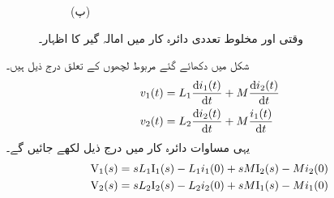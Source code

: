 \begin{figure}
\begin{subfigure}{0.6\textwidth}
\caption*{(پ)}
\end{subfigure}%
\caption{وقتی اور مخلوط تعددی دائرہ کار میں امالہ گیر کا اظہار۔}
\label{شکل_لاپلاس_دور_امالہ_گیر_اظہار}
\end{figure}

شکل  میں دکھائے گئے مربوط لچھوں کے تعلق درج ذیل ہیں۔
\begin{align}
v_1(t)&=L_1 \frac{\dif i_1(t)}{\dif t}+M\frac{\dif i_2(t)}{\dif t}\\
v_2(t)&=L_2 \frac{\dif i_2(t)}{\dif t}+M\frac{i_1(t)}{\dif t}
\end{align} 
یہی مساوات  دائرہ کار میں درج ذیل لکھے جائیں گے۔
\begin{align}
{\ensuremath{{\textup{V}}}}_1(s)&=sL_1 {{\textup{I}}}_1(s)-L_1 i_1(0)+sM{{\textup{I}}}_2(s)-M i_2(0)\\
{{\textup{V}}}_2(s)&=sL_2 {{\textup{I}}}_2(s)-L_2 i_2(0)+sM{{\textup{I}}}_1(s)-M i_1(0)
\end{align}
%

